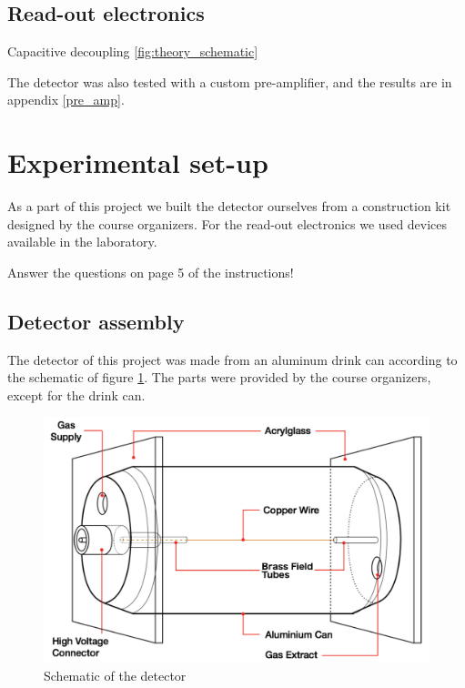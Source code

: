 \documentclass[a4paper]{article}
\begin{document}
\subsection{Read-out electronics}
\label{electronics}


Capacitive decoupling \ref{fig:theory_schematic}

The detector was also tested with a custom pre-amplifier, and the results are in appendix \ref{pre_amp}.


\clearpage
\section{Experimental set-up}
\label{setup}
As a part of this project we built the detector ourselves from a construction kit designed by the course organizers.
For the read-out electronics we used devices available in the laboratory.

Answer the questions on page 5 of the instructions!


\subsection{Detector assembly}
\label{assembly}
The detector of this project was made from an aluminum drink can according to the schematic of figure \ref{fig:schematic}.
The parts were provided by the course organizers, except for the drink can.

\begin{figure}[ht!]
\centering
\includegraphics[width=\textwidth]{fig/instructions/schematic.png}
\caption{Schematic of the detector \cite{instructions}}
\label{fig:schematic}
\end{figure}
\end{document}
